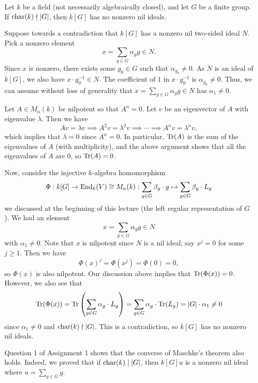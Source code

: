 \begin{theo}[Maschke]{}
Let $k$ be a field (not necessarily algebraically closed), and let $G$ be a finite group. If 
$\operatorname{char}(k) \nmid |G|$, then $k[G]$ has no nonzero nil ideals. 
\end{theo}
\begin{pf}
Suppose towards a contradiction that $k[G]$ has a nonzero nil two-sided ideal $N$. Pick a nonzero 
element 
\[ x = \sum_{g \in G} \alpha_g g \in N. \]
Since $x$ is nonzero, there exists some $g_0 \in G$ such that $\alpha_{g_0} \neq 0$. As 
$N$ is an ideal of $k[G]$, we also have $x \cdot g_0^{-1} \in N$. The coefficient of $1$ in 
$x \cdot g_0^{-1}$ is $\alpha_{g_0} \neq 0$. Thus, we can assume without loss of generality that 
$x = \sum_{g \in G} \alpha_g g \in N$ has $\alpha_1 \neq 0$. 

Let $A \in M_n(k)$ be nilpotent so that $A^n = 0$. Let $v$ be an eigenvector of $A$ with eigenvalue $\lambda$. Then we have 
\[ Av = \lambda v \implies A^2v = \lambda^2v \implies \cdots \implies A^n v = \lambda^n v, \]
which implies that $\lambda = 0$ since $A^n = 0$. In particular, $\operatorname{Tr}(A)$ is the sum of the 
eigenvalues of $A$ (with multiplicity), and the above argument shows that all the eigenvalues of 
$A$ are $0$, so $\operatorname{Tr}(A) = 0$.

Now, consider the injective $k$-algebra homomorphism 
\begin{align*}
    \Phi : k[G] \to \operatorname{End}_k(V) \cong M_n(k) : \sum_{g \in G} \beta_g \cdot g \mapsto \sum_{g \in G} \beta_g \cdot L_g
\end{align*}
we discussed at the beginning of this lecture (the left regular representation of $G$). We had an 
element 
\[ x = \sum_{g \in G} \alpha_g g \in N \]
with $\alpha_1 \neq 0$. Note that $x$ is nilpotent since $N$ is a nil ideal; say
$x^j = 0$ for some $j \geq 1$. Then we have 
\[ \Phi(x)^j = \Phi(x^j) = \Phi(0) = 0, \]
so $\Phi(x)$ is also nilpotent. Our discussion above implies that $\operatorname{Tr}(\Phi(x)) = 0$. However, 
we also see that 
\[ \operatorname{Tr}(\Phi(x)) = \operatorname{Tr}\left( \sum_{g \in G} \alpha_g \cdot L_g \right)
= \sum_{g \in G} \alpha_g \cdot \operatorname{Tr}(L_g) = |G| \cdot \alpha_1 \neq 0 \]
since $\alpha_1 \neq 0$ and $\operatorname{char}(k) \nmid |G|$. This is a contradiction, so $k[G]$ has 
no nonzero nil ideals. 
\end{pf}

\begin{remark}{}
Question 1 of Assignment 1 shows that the converse of Maschke's theorem also holds. Indeed, we 
proved that if $\operatorname{char}(k) \mid |G|$, then $k[G]u$ is a nonzero nil ideal where $u = \sum_{g \in G} g$. 
\end{remark}

